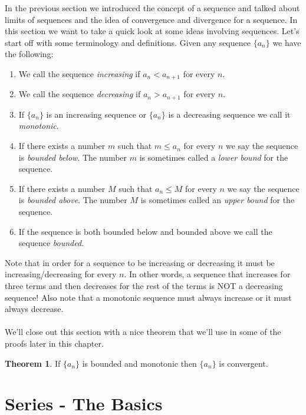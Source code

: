 \documentclass[10pt,reqno]{book}
\theoremstyle{definition}
\newtheorem{theorem}{Theorem}[section]
\begin{document}
	In the previous section we introduced the concept of a sequence and talked about limits of sequences and the idea of convergence and divergence for a sequence. In this section we want to take a quick look at some ideas involving sequences. Let's start off with some terminology and definitions.
	Given any sequence $ \{ a_n \} $ we have the following:
	\begin{enumerate}
		\item We call the sequence \textit{increasing} if $ a_n < a_{n+1} $ for every $ n $.
		\item We call the sequence \textit{decreasing} if $ a_n > a_{n+1} $ for every $ n $.
		\item If $ \{ a_n \} $ is an increasing sequence or $ \{ a_n \} $ is a decreasing sequence we call it \textit{monotonic}.
		\item If there exists a number $ m $ such that $ m \leq a_n $ for every $ n $ we say the sequence is \textit{bounded below}. The number $ m $ is sometimes called a \textit{lower bound} for the sequence.
		\item If there exists a number $ M $ such that $ a_n \leq M $ for every $ n $ we say the sequence is \textit{bounded above}. The number $ M $ is sometimes called an \textit{upper bound} for the sequence.
		\item If the sequence is both bounded below and bounded above we call the sequence \textit{bounded}.
	\end{enumerate}
	Note that in order for a sequence to be increasing or decreasing it must be increasing/decreasing for every $ n $. In other words, a sequence that increases for three terms and then decreases for the rest of the terms is NOT a decreasing sequence! Also note that a monotonic sequence must always increase or it must always decrease.\\ \\
	We'll close out this section with a nice theorem that we'll use in some of the proofs later in this chapter.
	\begin{theorem}
		If $ \{ a_n \} $ is bounded and monotonic then $ \{ a_n \} $ is convergent.
	\end{theorem}

	\section{Series - The Basics}
	
\end{document}
